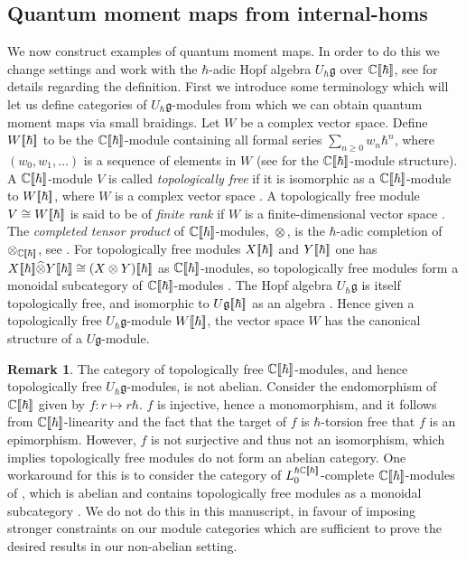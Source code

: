\documentclass[12pt,dvipsnames]{article}
\numberwithin{equation}{section}
\theoremstyle{definition}
\newtheorem{remark}[definition]{Remark}
\newcommand{\C}{\ensuremath{\mathbb{C}}}
\newcommand{\1}{\ensuremath{\mathbbm{1}}}
\newcommand{\llb}{[\hspace{-1.7pt}[}
\newcommand{\rrb}{]\hspace{-1.7pt}]}
\begin{document}
\subsection{Quantum moment maps from internal-homs}\label{ssec:QMMs from internal-homs}

We now construct examples of quantum moment maps. In order to do this we change settings and work with the $\hbar$-adic Hopf algebra $U_\hbar\mathfrak{g}$ over $\C\llb\hbar\rrb$, see \cite[Sec.\,6.1.3]{KS97} for details regarding the definition. First we introduce some terminology which will let us define categories of $U_\hbar\mathfrak{g}$-modules from which we can obtain quantum moment maps via small braidings. 
Let $W$ be a complex vector space. Define $W\llb\hbar\rrb$ to be the $\C\llb\hbar\rrb$-module containing all formal series $\sum_{n\geq0}w_n\hbar^n$, where $(w_0,w_1,\dots)$ is a sequence of elements in $W$ (see \cite[Eq.\,(XVI.1.2)]{Ka95} for the $\C\llb\hbar\rrb$-module structure). A $\C\llb\hbar\rrb$-module $V$ is called \emph{topologically free} if it is isomorphic as a $\C\llb\hbar\rrb$-module to $W\llb\hbar\rrb$, where $W$ is a complex vector space \cite[Sec.\,XVI.2]{Ka95}. A topologically free module $V\cong W\llb\hbar\rrb$ is said to be of \emph{finite rank} if $W$ is a finite-dimensional vector space \cite[Sec.\,XVII.3]{Ka95}. The \emph{completed tensor product} of $\C\llb\hbar\rrb$-modules, $\widehat{\otimes}$, is the $\hbar$-adic completion of $\otimes_{\C\llb\hbar\rrb}$, see \cite[Def.\,XVI.3.1]{Ka95}. For topologically free modules $X\llb\hbar\rrb$ and $Y\llb\hbar\rrb$ one has $X\llb\hbar\rrb\widehat{\otimes}Y\llb\hbar\rrb \cong (X\otimes Y)\llb\hbar\rrb$ as $\C\llb\hbar\rrb$-modules, so topologically free modules form a monoidal subcategory of $\C\llb\hbar\rrb$-modules \cite[Prop.\,XVI.3.2]{Ka95}. The Hopf algebra $U_\hbar\mathfrak{g}$ is itself topologically free, and isomorphic to $U\mathfrak{g}\llb\hbar\rrb$ as an algebra \cite[Thm.\,XVIII.4.1]{Ka95}. Hence given a topologically free $U_\hbar\mathfrak{g}$-module $W\llb\hbar\rrb$, the vector space $W$ has the canonical structure of a $U\mathfrak{g}$-module.

\begin{remark}
    The category of topologically free $\C\llb\hbar\rrb$-modules, and hence topologically free $U_\hbar\mathfrak{g}$-modules, is not abelian. Consider the endomorphism of $\C\llb\hbar\rrb$ given by $f: r\mapsto r\hbar$. $f$ is injective, hence a monomorphism, and it follows from $\C\llb\hbar\rrb$-linearity and the fact that the target of $f$ is $\hbar$-torsion free that $f$ is an epimorphism. However, $f$ is not surjective and thus not an isomorphism, which implies topologically free modules do not form an abelian category. One workaround for this is to consider the category of $L_0^{\hbar\C\llb\hbar\rrb}$-complete $\C\llb\hbar\rrb$-modules of \cite{PW20}, which is abelian and contains topologically free modules as a monoidal subcategory \cite[Prop.\,3.9]{PW20}. We do not do this in this manuscript, in favour of imposing stronger constraints on our module categories which are sufficient to prove the desired results in our non-abelian setting.
\end{remark}
\end{document}
